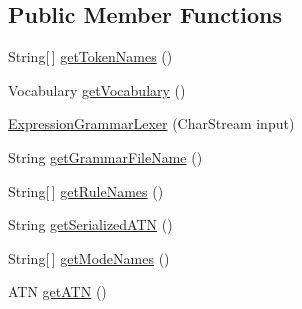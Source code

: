 \subsection*{Public Member Functions}
\begin{DoxyCompactItemize}
\item 
String\mbox{[}$\,$\mbox{]} \hyperlink{classgov_1_1nasa_1_1jpf_1_1inspector_1_1server_1_1expression_1_1parser_1_1_expression_grammar_lexer_a165aac7e220f40eca2be729af503688d}{get\+Token\+Names} ()
\item 
Vocabulary \hyperlink{classgov_1_1nasa_1_1jpf_1_1inspector_1_1server_1_1expression_1_1parser_1_1_expression_grammar_lexer_af2649520bfb9ea15638bfb9c790063f6}{get\+Vocabulary} ()
\item 
\hyperlink{classgov_1_1nasa_1_1jpf_1_1inspector_1_1server_1_1expression_1_1parser_1_1_expression_grammar_lexer_a27416e45ea142b3a37e1b6ed7f756c04}{Expression\+Grammar\+Lexer} (Char\+Stream input)
\item 
String \hyperlink{classgov_1_1nasa_1_1jpf_1_1inspector_1_1server_1_1expression_1_1parser_1_1_expression_grammar_lexer_ab3822a6267693fe9aa8dbbbe0ab61387}{get\+Grammar\+File\+Name} ()
\item 
String\mbox{[}$\,$\mbox{]} \hyperlink{classgov_1_1nasa_1_1jpf_1_1inspector_1_1server_1_1expression_1_1parser_1_1_expression_grammar_lexer_a7462c1a79ad76e718ae8a54379de5163}{get\+Rule\+Names} ()
\item 
String \hyperlink{classgov_1_1nasa_1_1jpf_1_1inspector_1_1server_1_1expression_1_1parser_1_1_expression_grammar_lexer_abfa2193801bb0690e79bd1931b0a2031}{get\+Serialized\+A\+TN} ()
\item 
String\mbox{[}$\,$\mbox{]} \hyperlink{classgov_1_1nasa_1_1jpf_1_1inspector_1_1server_1_1expression_1_1parser_1_1_expression_grammar_lexer_ab263da3dc4590a29de6df382a1f87f82}{get\+Mode\+Names} ()
\item 
A\+TN \hyperlink{classgov_1_1nasa_1_1jpf_1_1inspector_1_1server_1_1expression_1_1parser_1_1_expression_grammar_lexer_a061b81b53c6396e2e1b5260c364f0ba0}{get\+A\+TN} ()
\end{DoxyCompactItemize}
